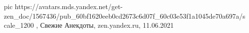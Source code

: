  
 
 
 
 

\ifcmt
  pic https://avatars.mds.yandex.net/get-zen_doc/1567436/pub_60bf1620eeb0cd2673c6d07f_60c03e53f1a1045de70a697a/scale_1200
\fi
{}, Свежие Анекдоты, zen.yandex.ru, 11.06.2021

